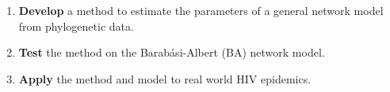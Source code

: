 \begin{frame}
    \begin{enumerate}
        \setlength{\itemsep}{24pt}
        \item \textbf{Develop} a method to estimate the parameters of a general
            network model from phylogenetic data.
            \pause
        \item \textbf{Test} the method on the Barab\'asi-Albert (BA) network
            model.
            \pause
        \item \textbf{Apply} the method and model to real world HIV epidemics.
    \end{enumerate}
\end{frame}
